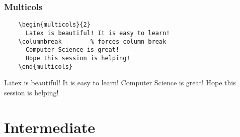 \documentclass{beamer}
\begin{document}
\begin{frame}[fragile]
  \frametitle{Multicols}
  \begin{verbatim}
    \begin{multicols}{2}
      Latex is beautiful! It is easy to learn!
    \columnbreak        % forces column break
      Computer Science is great!
      Hope this session is helping!
    \end{multicols}
  \end{verbatim}

  \begin{multicols}{2}
    Latex is beautiful! It is easy to learn!
  \columnbreak        %
    Computer Science is great!
    Hope this session is helping!
  \end{multicols}
\end{frame}

\section{Intermediate}
\end{document}
